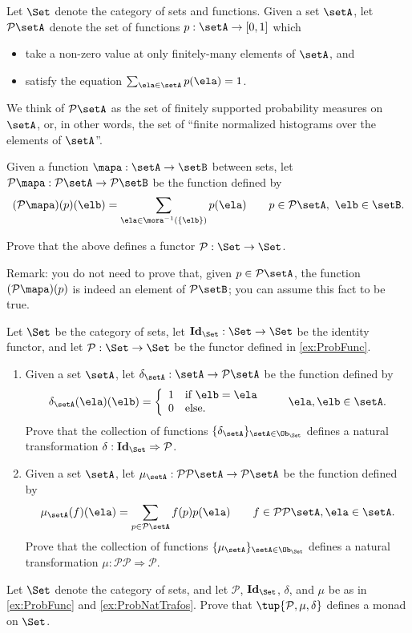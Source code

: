 \documentclass[paper=8.125in:10.250in,pagesize=pdftex,
    headinclude=false,footinclude=false,oneside,egregdoesnotlikesansseriftitles]{kaobook}
\begin{document}
\begin{gradedexercise}\label{ex:ProbFunc}
Let $\Set$ denote the category of sets and functions. 
Given a set $\setA$, let $\mathcal{P} \setA$ denote the set of functions $p: \setA \to [0,1]$ which 
\begin{itemize}
\item take a non-zero value at only finitely-many elements of $\setA$, and 
\item satisfy the equation $\sum_{\ela \in \setA} p(\ela) = 1$. 
\end{itemize}
We think of $\mathcal{P} \setA$ as the set of finitely supported probability measures on $\setA$, or, in other words, the set of ``finite normalized histograms over the elements of $\setA$''. 

Given a function $\mapa: \setA \to \setB$ between sets, let $\mathcal{P} \mapa: \mathcal{P}\setA \to \mathcal{P}\setB$ be the function defined by 
$$ (\mathcal{P} \mapa)(p)(\elb) = \sum_{\ela \in \mora^{-1}(\{ \elb \})} p(\ela) \quad \quad  p \in \mathcal{P}\setA, \  \elb \in \setB.$$

Prove that the above defines a functor $\mathcal{P}: \Set \to \Set$. 

Remark: you do not need to prove that, given $p \in \mathcal{P}\setA$, the function $(\mathcal{P} \mapa)(p)$ is indeed an element of $\mathcal{P}\setB$; you can assume this fact to be true. 
\end{gradedexercise}

\begin{gradedexercise}\label{ex:ProbNatTrafos}
Let $\Set$ be the category of sets, let $\mathbf{Id}_\Set : \Set \to \Set$ be the identity functor, and let $\mathcal{P}: \Set \to \Set$ be the functor defined in \cref{ex:ProbFunc}. 
\begin{enumerate}
\item Given a set $\setA$, let $\delta_{\setA} : \setA \to \mathcal{P} \setA$ be the function defined by
$$\delta_\setA (\ela)(\elb) = \left\{\begin{array}{ll}
        1 & \text{if } \elb = \ela \\
        0 & \text{else.} 
        \end{array}\right. 
  \quad \quad \ela, \elb \in \setA.$$
Prove that the collection of functions $\{ \delta_{\setA} \}_{\setA \in \Ob_{\Set}}$ defines a natural transformation $\delta: \mathbf{Id}_\Set \Rightarrow \mathcal{P}$. 
\item Given a set $\setA$, let $\mu_\setA : \mathcal{P} \mathcal{P} \setA \to \mathcal{P} \setA$ be the function defined by 
$$\mu_\setA (f)(\ela) = \sum_{p \in \mathcal{P} \setA} f(p) p(\ela) \quad \quad f \in \mathcal{P} \mathcal{P} \setA, \ela \in \setA.$$
Prove that the collection of functions $\{ \mu_{\setA} \}_{\setA \in \Ob_{\Set}}$ defines a natural transformation $\mu: \mathcal{P} \mathcal{P} \Rightarrow \mathcal{P}$. 

\end{enumerate}
\end{gradedexercise}

\begin{gradedexercise}
Let $\Set$ denote the category of sets, and let $\mathcal{P}$, $\mathbf{Id}_\Set$, $\delta$, and $\mu$ be as in \cref{ex:ProbFunc} and \cref{ex:ProbNatTrafos}. 
Prove that $\tup{\mathcal{P}, \mu, \delta}$ defines a monad on $\Set$. 
\end{gradedexercise}
\end{document}
